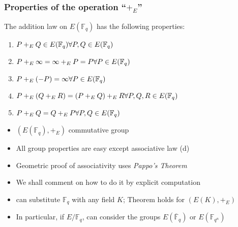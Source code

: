 \documentclass[10pt,final]{beamer} %
\newcommand{\Q}{\mathbb Q}
\newcommand{\F}{\mathbb F}
\newcommand{\C}{\mathbb C}
\theoremstyle{definition}
\begin{document}
\begin{frame}
\frametitle{Properties of the operation ``$+_E$''}

\begin{Theorem}
 The addition law on $E(\F_q)$ has the following
properties:
\begin{enumerate}[<+-| alert@+>][(a)]
 \item $P+_EQ\in E(\F_q)\hfill\forall P,Q\in E(\F_q)$
 \item  $P+_E\infty=\infty+_E P=P\hfill\forall P\in E(\F_q)$
 \item  $P+_E(-P)=\infty\hfill\forall P\in E(\F_q)$
 \item  $P+_E(Q +_E R)=(P+_E Q)+_E R\hfill\forall P,Q,R\in E(\F_q)$
 \item  $P+_E Q=Q +_E P\hfill\forall P,Q\in E(\F_q)$
\end{enumerate}
 \end{Theorem}\pause

\begin{itemize}[<+-| alert@+>]
 \item $\left(E(\F_q),+_E\right)$  \alert{commutative group}
 \item All group properties are easy except \alert{associative law (d)}
 \item Geometric proof of associativity uses \emph{Pappo's Theorem}
 \item We shall comment on how to do it by explicit computation
 \item can substitute $\F_q$ with any field $K$; Theorem holds for $\left(E(K),+_E\right)$
\item In particular, if $E/\F_q$, can consider the groups $E(\overline{\F}_q)$ or $E(\F_{q^n})$
\end{itemize}
\end{frame}
\end{document}
